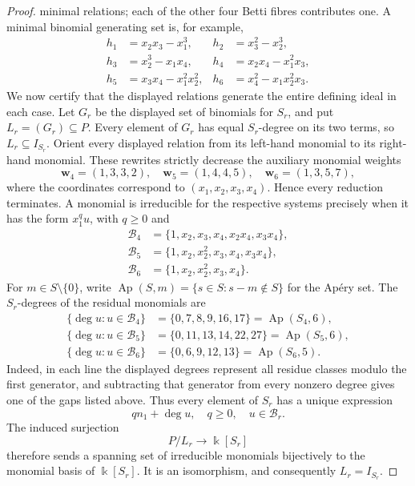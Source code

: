 \documentclass[10pt]{amsart}
\theoremstyle{plain}
\begin{document}
\begin{proof}
minimal relations; each of the other four Betti fibres contributes one.  A
minimal binomial generating set is, for example,
\begin{equation}\label{eq:sharpness-type3-generators}
\begin{aligned}
h_1&=x_2x_3-x_1^3,       & h_2&=x_3^2-x_2^3,\\
h_3&=x_2^3-x_1x_4,       & h_4&=x_2x_4-x_1^2x_3,\\
h_5&=x_3x_4-x_1^2x_2^2, & h_6&=x_4^2-x_1x_2^2x_3.
\end{aligned}
\end{equation}
We now certify that the displayed relations generate the entire defining
ideal in each case.  Let \(G_r\) be the displayed set of binomials for
\(S_r\), and put \(L_r=(G_r)\subseteq P\).  Every element of \(G_r\)
has equal \(S_r\)-degree on its two terms, so \(L_r\subseteq I_{S_r}\).
Orient every displayed relation from its left-hand monomial to its
right-hand monomial.  These rewrites strictly decrease the auxiliary
monomial weights
\[
\mathbf w_4=(1,3,3,2),\quad
\mathbf w_5=(1,4,4,5),\quad
\mathbf w_6=(1,3,5,7),
\]
where the coordinates correspond to \((x_1,x_2,x_3,x_4)\).  Hence every
reduction terminates.  A monomial is irreducible for the respective systems
precisely when it has the form \(x_1^qu\), with \(q\ge0\) and
\[
\begin{aligned}
\mathcal B_4&=\{1,x_2,x_3,x_4,x_2x_4,x_3x_4\},\\
\mathcal B_5&=\{1,x_2,x_2^2,x_3,x_4,x_3x_4\},\\
\mathcal B_6&=\{1,x_2,x_2^2,x_3,x_4\}.
\end{aligned}
\]
For \(m\in S\setminus\{0\}\), write
\(\operatorname{Ap}(S,m)=\{s\in S:s-m\notin S\}\) for the Ap\'ery set.
The \(S_r\)-degrees of the residual monomials are
\[
\begin{aligned}
\{\deg u:u\in\mathcal B_4\}
 &=\{0,7,8,9,16,17\}=\operatorname{Ap}(S_4,6),\\
\{\deg u:u\in\mathcal B_5\}
 &=\{0,11,13,14,22,27\}=\operatorname{Ap}(S_5,6),\\
\{\deg u:u\in\mathcal B_6\}
 &=\{0,6,9,12,13\}=\operatorname{Ap}(S_6,5).
\end{aligned}
\]
Indeed, in each line the displayed degrees represent all residue classes
modulo the first generator, and subtracting that generator from every
nonzero degree gives one of the gaps listed above.  Thus every element of
\(S_r\) has a unique expression
\[
qn_1+\deg u,
\quad q\ge0,\quad u\in\mathcal B_r.
\]
The induced surjection
\[
P/L_r\longrightarrow\Bbbk[S_r]
\]
therefore sends a spanning set of irreducible monomials bijectively to the
monomial basis of \(\Bbbk[S_r]\).  It is an isomorphism, and consequently
\(L_r=I_{S_r}\).


\end{proof}
\end{document}
